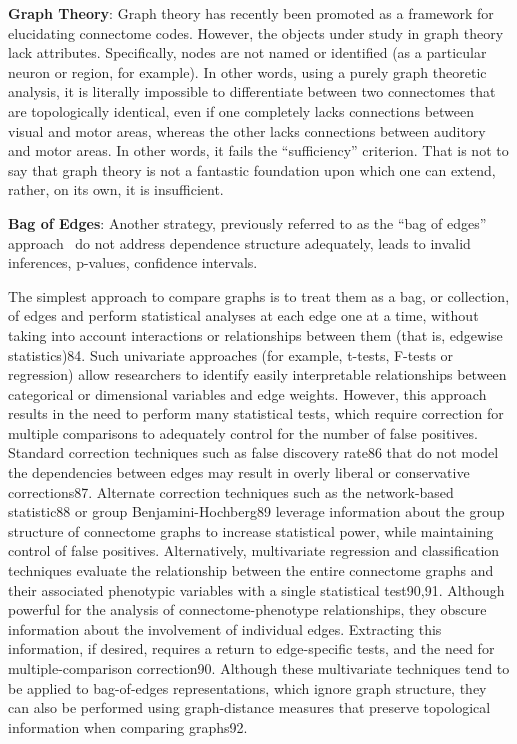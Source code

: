 \documentclass[11pt]{article}
\begin{document}
    \textbf{Graph Theory}: Graph theory has recently been promoted as a framework for elucidating connectome codes.  However, the objects under study in graph theory lack attributes.  Specifically, nodes are not named or identified (as a particular neuron or region, for example).  In other words, using a purely graph theoretic analysis, it is literally impossible to differentiate between two connectomes that are topologically identical, even if one completely lacks connections between visual and motor areas, whereas the other lacks connections between auditory and motor areas. In other words, it fails the ``sufficiency'' criterion.  That is not to say that graph theory is not a fantastic foundation upon which one can extend, rather, on its own, it is insufficient. 
    
    \textbf{Bag of Edges}: Another strategy, previously referred to as the ``bag of edges'' approach~\cite{Craddock2013-gf} do not address dependence structure adequately, leads to invalid inferences, p-values, confidence intervals.
    
    
     The simplest approach to compare graphs is to
treat them as a bag, or collection, of edges and perform statistical
analyses at each edge one at a time, without taking into account
interactions or relationships between them (that is, edgewise
statistics)84. Such univariate approaches (for example, t-tests,
F-tests or regression) allow researchers to identify easily interpretable
relationships between categorical or dimensional variables
and edge weights. However, this approach results in the
need to perform many statistical tests, which require correction
for multiple comparisons to adequately control for the number
of false positives. Standard correction techniques such as false
discovery rate86 that do not model the dependencies between
edges may result in overly liberal or conservative corrections87.
Alternate correction techniques such as the network-based statistic88
or group Benjamini-Hochberg89 leverage information about
the group structure of connectome graphs to increase statistical
power, while maintaining control of false positives.
Alternatively, multivariate regression and classification techniques
evaluate the relationship between the entire connectome
graphs and their associated phenotypic variables with a single
statistical test90,91. Although powerful for the analysis of connectome-phenotype
relationships, they obscure information about
the involvement of individual edges. Extracting this information,
if desired, requires a return to edge-specific tests, and the need for
multiple-comparison correction90. Although these multivariate
techniques tend to be applied to bag-of-edges representations,
which ignore graph structure, they can also be performed using
graph-distance measures that preserve topological information
when comparing graphs92.
\end{document}

